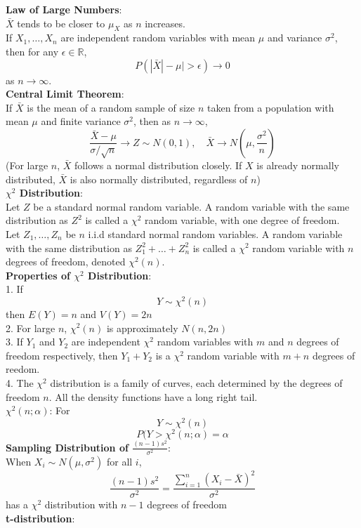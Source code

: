 \documentclass{article}
\begin{document}
\begin{multicols*}{3}
\textbf{Law of Large Numbers}:\\
$\bar{X}$ tends to be closer to $\mu_X$ as $n$ increases. \\
If $X_1,\dots,X_n$ are independent random variables with mean $\mu$ and variance $\sigma^2$, then for any $\epsilon\in\mathbb{R}$, $$P(|\bar{X}|-\mu|>\epsilon)\to 0$$ as $n\to \infty$.\\
\textbf{Central Limit Theorem}:\\
If $\bar{X}$ is the mean of a random sample of size $n$ taken from a population with mean $\mu$ and finite variance $\sigma^2$, then as $n\to\infty$, $$\frac{\bar{X}-\mu}{\sigma/\sqrt{n}}\to Z\sim N(0,1), \quad \bar{X}\to N(\mu,\frac{\sigma^2}{n})$$
(For large $n$, $\bar{X}$ follows a normal distribution closely. If $X$ is already normally distributed, $\bar{X}$ is also normally distributed, regardless of $n$)\\
\textbf{$\chi^2$ Distribution}:\\
Let $Z$ be a standard normal random variable. A random variable with the same distribution as $Z^2$ is called a $\chi^2$ random variable, with one degree of freedom.\\
Let $Z_1,\dots,Z_n$ be $n$ i.i.d standard normal random variables. A random variable with the same distribution as $Z_1^2+\dots+Z_n^2$ is called a $\chi^2$ random variable with $n$ degrees of freedom, denoted $\chi^2(n)$.\\
\textbf{Properties of $\chi^2$ Distribution}:\\
1. If $$Y\sim \chi^2(n)$$ then $E(Y)=n$ and $V(Y)=2n$\\
2. For large $n$, $\chi^2(n)$ is approximately $N(n,2n)$\\
3. If $Y_1$ and $Y_2$ are independent $\chi^2$ random variables with $m$ and $n$ degrees of freedom respectively, then $Y_1+Y_2$ is a $\chi^2$ random variable with $m+n$ degrees of reedom.\\
4. The $\chi^2$ distribution is a family of curves, each determined by the degrees of freedom $n$. All the density functions have a long right tail.\\
$\chi^2(n;\alpha)$: For $$Y\sim \chi^2(n)$$
$$P(Y>\chi^2(n;\alpha)=\alpha$$
\textbf{Sampling Distribution of $\frac{(n-1)s^2}{\sigma^2}$}:\\
When $X_i\sim N(\mu,\sigma^2)$ for all $i$, 
$$\frac{(n-1)s^2}{\sigma^2}=\frac{\sum_{i=1}^n(X_i-\bar{X})^2}{\sigma^2}$$ has a $\chi^2$ distribution with $n-1$ degrees of freedom\\
\textbf{t-distribution}:\\

\end{multicols*}
\end{document}
